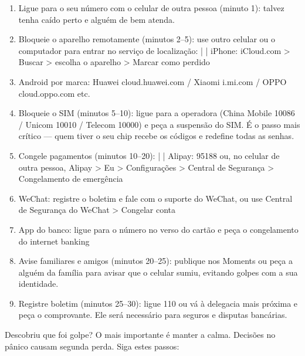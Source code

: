 \begin{enumerate}
  \item Ligue para o seu número com o celular de outra pessoa (minuto 1): talvez tenha caído perto e alguém de bem atenda.
  \item Bloqueie o aparelho remotamente (minutos 2–5): use outro celular ou o computador para entrar no serviço de localização: | | iPhone: iCloud.com > Buscar > escolha o aparelho > Marcar como perdido
  \item Android por marca: Huawei cloud.huawei.com / Xiaomi i.mi.com / OPPO cloud.oppo.com etc.
  \item Bloqueie o SIM (minutos 5–10): ligue para a operadora (China Mobile 10086 / Unicom 10010 / Telecom 10000) e peça a suspensão do SIM. É o passo mais crítico — quem tiver o seu chip recebe os códigos e redefine todas as senhas.
  \item Congele pagamentos (minutos 10–20): | | Alipay: 95188 ou, no celular de outra pessoa, Alipay > Eu > Configurações > Central de Segurança > Congelamento de emergência
  \item WeChat: registre o boletim e fale com o suporte do WeChat, ou use Central de Segurança do WeChat > Congelar conta
  \item App do banco: ligue para o número no verso do cartão e peça o congelamento do internet banking
  \item Avise familiares e amigos (minutos 20–25): publique nos Moments ou peça a alguém da família para avisar que o celular sumiu, evitando golpes com a sua identidade.
  \item Registre boletim (minutos 25–30): ligue 110 ou vá à delegacia mais próxima e peça o comprovante. Ele será necessário para seguros e disputas bancárias.
\end{enumerate}


Descobriu que foi golpe? O mais importante é manter a calma. Decisões no pânico causam segunda perda. Siga estes passos:

